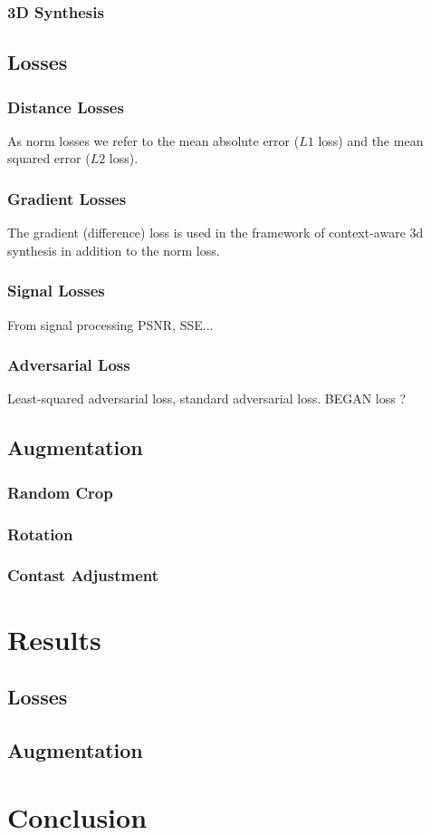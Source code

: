 \documentclass[
  a4paper,
  abstracton,
  emulatestandardclasses,
]{scrartcl}
\begin{document}
\subsubsection{3D Synthesis}

\subsection{Losses}

\subsubsection{Distance Losses}

As norm losses we refer to the mean absolute error ($L1$ loss) and the
mean squared error ($L2$ loss).

\subsubsection{Gradient Losses}

The gradient (difference) loss is used in the framework of context-aware
3d synthesis \cite{Nie16} in addition to the norm loss.

\subsubsection{Signal Losses}

From signal processing PSNR, SSE...

\subsubsection{Adversarial Loss}

Least-squared adversarial loss, standard adversarial loss. BEGAN loss ?


\subsection{Augmentation}

\subsubsection{Random Crop}
\subsubsection{Rotation}
\subsubsection{Contast Adjustment}

\section{Results}

\subsection{Losses}

\subsection{Augmentation}

\section{Conclusion}

\printbibliography{}
\end{document}
